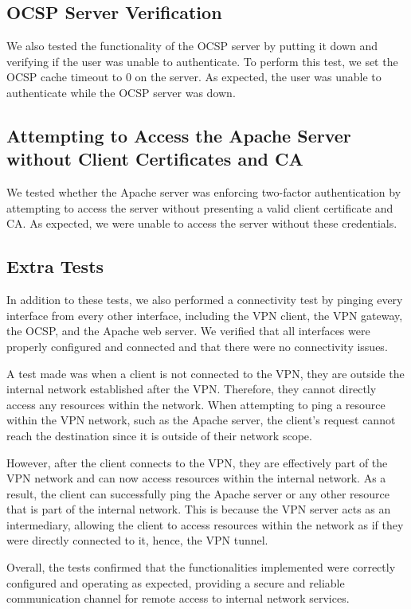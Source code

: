 \documentclass[12pt]{article}
\begin{document}
\subsection{OCSP Server Verification}
We also tested the functionality of the OCSP server by putting it down and verifying if the user was unable to authenticate. To perform this test, we set the OCSP cache timeout to 0 on the server. As expected, the user was unable to authenticate while the OCSP server was down.

\subsection{Attempting to Access the Apache Server without Client Certificates and CA}
We tested whether the Apache server was enforcing two-factor authentication by attempting to access the server without presenting a valid client certificate and CA. As expected, we were unable to access the server without these credentials.

\newpage

\subsection{Extra Tests}

In addition to these tests, we also performed a connectivity test by pinging every interface from every other interface, including the VPN client, the VPN gateway, the OCSP, and the Apache web server. We verified that all interfaces were properly configured and connected and that there were no connectivity issues.

A test made was when a client is not connected to the VPN, they are outside the internal network established after the VPN. Therefore, they cannot directly access any resources within the network. When attempting to ping a resource within the VPN network, such as the Apache server, the client's request cannot reach the destination since it is outside of their network scope.

However, after the client connects to the VPN, they are effectively part of the VPN network and can now access resources within the internal network. As a result, the client can successfully ping the Apache server or any other resource that is part of the internal network. This is because the VPN server acts as an intermediary, allowing the client to access resources within the network as if they were directly connected to it, hence, the VPN tunnel.

Overall, the tests confirmed that the functionalities implemented were correctly configured and operating as expected, providing a secure and reliable communication channel for remote access to internal network services.
\end{document}
